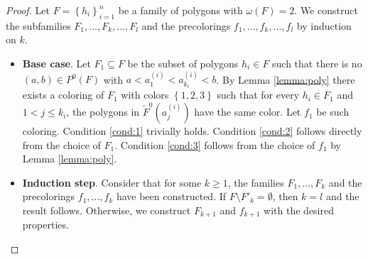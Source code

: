 \documentclass[12pt]{article}
\theoremstyle{definition}
\begin{document}
     \begin{proof}
         Let $F = \left\{h_{i}\right\}_{i = 1}^{n}$
         be a family of polygons with
         $\omega\left(F\right) = 2$.
         We construct the subfamilies
         $F_1, \ldots, F_{k}, \ldots, F_{l}$ 
         and the precolorings
         $f_1, \ldots, f_{k}, \ldots, f_{l}$ 
         by induction on $k$.

         \begin{itemize}
             \item \textbf{Base case}.
                 Let $F_1 \subseteq F$
                 be the subset of polygons
                 $h_{i} \in F$ such that 
                 there is no $\left(a, b\right)
                 \in P^{0}\left(F\right)$
                 with $a < a_1^{\left(i\right)} <
                 a_{k_{i}}^{\left(i\right)} < b$.
                 By Lemma \ref{lemma:poly} there
                 exists a coloring of $F_1$
                 with colors $\left\{1, 2, 3\right\}$ 
                 such that for every $h_{i} \in F_1$ 
                 and $1 < j \leq k_{i}$,
                 the polygons in 
                 $\widetilde{F}^{0}\left(a_{j}^{\left(i\right)}\right)$ 
                 have the same color.
                 Let $f_1$ be such coloring.
                 Condition \ref{cond:1} trivially holds.
                 Condition \ref{cond:2} follows 
                 directly from the choice of $F_1$.
                 Condition \ref{cond:3} follows
                 from the choice of $f_1$ by
                 Lemma \ref{lemma:poly}.
             \item \textbf{Induction step}.
                 Consider that for some
                 $k \geq 1$, the families
                 $F_1, \ldots, F_{k}$
                 and the precolorings $f_1, \ldots, f_{k}$ 
                 have been constructed.
                 If $F \setminus F'_{k} = \emptyset$,
                 then $k = l$ and the
                 result follows.
                 Otherwise, we construct
                 $F_{k+1}$ and $f_{k+1}$ 
                 with the desired properties.


\end{itemize}
\end{proof}
\end{document}
